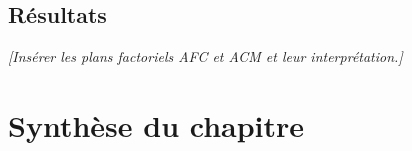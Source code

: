 \subsection{Résultats}
\emph{[Insérer les plans factoriels AFC et ACM et leur interprétation.]}

\section{Synthèse du chapitre}
\label{sec:contexte-synthese}
